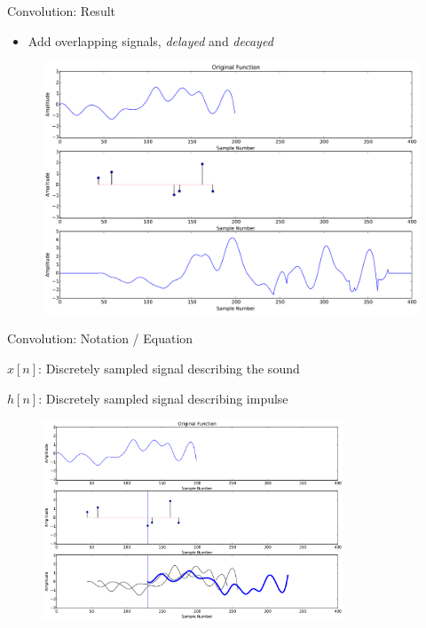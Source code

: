 \documentclass{beamer}
\begin{document}
\begin{frame}{Convolution: Result}

\begin{itemize}[label=$\vartriangleright$]
\item Add overlapping signals, {\em delayed} and {\em decayed}
\end{itemize}

\begin{figure}[t]
	\centering
    \includegraphics[width=\textwidth]{ConvResult.pdf}
\end{figure}


\end{frame}


\begin{frame}{Convolution: Notation / Equation}

$x[n]$: Discretely sampled signal describing the sound

$h[n]$: Discretely sampled signal describing impulse

\begin{figure}[t]
	\centering
    \includegraphics[width=0.8\textwidth]{Conv2.pdf}
\end{figure}

\end{frame}
\end{document}
